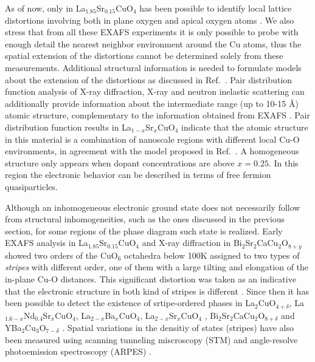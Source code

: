 As of now, only in La$_{1.85}$Sr$_{0.15}$CuO$_{4}$ has been possible to identify local lattice distortions involving both in plane oxygen and apical oxygen atoms  \cite{Bianconi1996}. 
We also stress that from all these EXAFS experiments it is only possible to probe with enough detail the nearest neighbor environment around the Cu atoms, thus the spatial extension of the distortions cannot be determined solely from these measurements. 
Additional structural information \cite{Bianconi1996a} is needed to formulate models about the extension of the distortions as discussed in Ref.\ \cite{Bianconi1996}.
Pair distribution function analysis of X-ray diffraction, X-ray and neutron inelastic scattering can additionally provide information about the intermediate range (up to 10-15 \AA) atomic structure, complementary to the information obtained from EXAFS \cite{Egami2003}. 
Pair distribution function results in La$_{1-x}$Sr$_{x}$CuO$_{4}$ \cite{Bozin1999,Bozin2000} indicate that the atomic structure in this material is a combination of nanoscale regions with different local Cu-O environments, in agreement with the model proposed in Ref.\  \cite{Bianconi1996}. 
A homogeneous structure only appears when dopant concentrations are above $x = 0.25$. 
In this region the electronic behavior can be described in terms of free fermion quasiparticles.

Although an inhomogeneous electronic ground state does not necessarily follow from structural inhomogeneities, such as the ones discussed in the previous section, for some regions of the phase diagram such state is realized.
Early EXAFS analysis in La$_{1.85}$Sr$_{0.15}$CuO$_4$ and X-ray diffraction in Bi$_2$Sr$_2$CaCu$_2$O$_{8+y}$ showed two orders of the CuO$_6$ octahedra below 100K assigned to two types of \textit{stripes} with different order, one of them with a large tilting and elongation of the in-plane Cu-O distances.
This significant distortion was taken as an indicative that the electronic structure in both kind of stripes is different \cite{Bianconi1996,Bianconi1996a}.
Since then it has been possible to detect the existence of srtipe-ordered phases in La$_2$CuO$_{4+\delta}$, La$_{1.6-x}$Nd$_{0.4}$Sr$_x$CuO$_4$, La$_{2-x}$Ba$_x$CuO$_4$, La$_{2-x}$Sr$_x$CuO$_4$ \cite{Kivelson2003}, Bi$_2$Sr$_2$CaCu$_2$O$_{8+\delta}$ \cite{Poccia2011a} and YBa$_2$Cu$_3$O$_{7-\delta}$ \cite{Mook2002,Haase2003}.
Spatial variations in the densitiy of states (stripes) have also been measured using scanning tunneling miscroscopy (STM) \cite{Pan2001} and angle-resolve photoemission spectroscopy (ARPES) \cite{Salkola1996}. 

